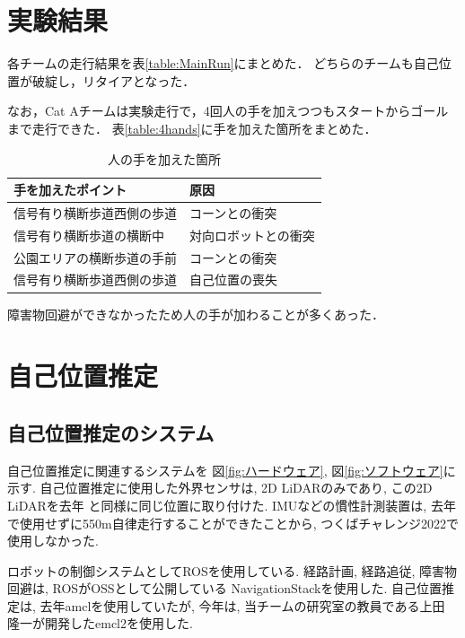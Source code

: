 \documentclass[twocolumn,9pt]{jsproceedings}
\begin{document}
\section{実験結果}

各チームの走行結果を表\ref{table:MainRun}にまとめた．
どちらのチームも自己位置が破綻し，リタイアとなった．


なお，Cat Aチームは実験走行で，4回人の手を加えつつもスタートからゴールまで走行できた．
表\ref{table:4hands}に手を加えた箇所をまとめた．

\begin{table}[h]
  \label{4hands}
  \begin{tabular}{|l|l|}
    \hline
    手を加えたポイント & 原因 \\
    \hline
    信号有り横断歩道西側の歩道 & コーンとの衝突 \\
    \hline
    信号有り横断歩道の横断中 & 対向ロボットとの衝突 \\ 
    \hline
    公園エリアの横断歩道の手前 & コーンとの衝突 \\ 
    \hline
    信号有り横断歩道西側の歩道 & 自己位置の喪失 \\ 
    \hline
  \end{tabular}
  \caption{人の手を加えた箇所}
\end{table}

障害物回避ができなかったため人の手が加わることが多くあった．

\section{自己位置推定}

\subsection{自己位置推定のシステム}

自己位置推定に関連するシステムを
図\ref{fig:ハードウェア}, 図\ref{fig:ソフトウェア}に示す. 
自己位置推定に使用した外界センサは, 2D LiDARのみであり,
この2D LiDARを去年\cite{去年のつくばチャレンジシンポジウム}
と同様に同じ位置に取り付けた.
IMUなどの慣性計測装置は, 去年で使用せずに550m自律走行することができたことから, 
つくばチャレンジ2022で使用しなかった. 

ロボットの制御システムとしてROSを使用している. 
経路計画, 経路追従, 障害物回避は, ROSがOSSとして公開している
NavigationStackを使用した. 
自己位置推定は, 去年amclを使用していたが, 
今年は, 当チームの研究室の教員である上田 隆一が開発したemcl2を使用した. 
\end{document}
